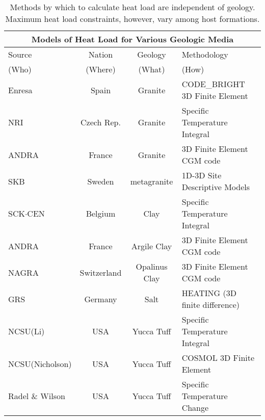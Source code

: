  \begin{table}[h!]
    \centering
    \footnotesize{
    \begin{tabularx}{\textwidth}{|X|c|c|X|}
      \multicolumn{4}{c}{\textbf{Models of Heat Load for Various Geologic Media}}\\
      \hline
      Source & Nation & Geology & Methodology \\  
      (Who) & (Where) & (What) & (How) \\  
      \hline
      Enresa \cite{von_lensa_red-impact_2008}           & Spain       & Granite       &  CODE\_BRIGHT 3D Finite Element \\ 
      NRI   \cite{von_lensa_red-impact_2008}            & Czech Rep.  & Granite       &  Specific Temperature Integral   \\
      ANDRA \cite{andra_granite:_2005}                  & France      & Granite       &  3D Finite Element CGM code   \\
      SKB \cite{ab_long-term_2006}                      & Sweden      & metagranite   &  1D-3D Site  Descriptive Models \\
      SCK$\cdot$CEN   \cite{von_lensa_red-impact_2008}  & Belgium     & Clay          &  Specific Temperature Integral   \\ 
      ANDRA \cite{andra_argile:_2005}                   & France      & Argile Clay   &  3D Finite Element CGM code   \\
      NAGRA \cite{johnson_project_2002, johnson_calculations_2002}  & Switzerland  & Opalinus Clay &  3D Finite Element CGM code \\
      GRS \cite{von_lensa_red-impact_2008}              & Germany     & Salt          &  HEATING (3D finite difference)   \\ 
      NCSU(Li)   \cite{li_examining_2007}               & USA         & Yucca Tuff    &  Specific Temperature Integral \\        
      NCSU(Nicholson) \cite{nicholson_thermal_2007}     & USA         & Yucca Tuff    &  COSMOL 3D Finite Element\\
      Radel \& Wilson \cite{radel_repository_2007}      & USA         & Yucca Tuff    &  Specific Temperature Change \\ 
      \hline
    \end{tabularx}
    \caption[International heat transport modeling methods in various geologic host media.]{Methods by which to calculate heat 
    load are independent of geology. Maximum heat load constraints, however, vary among host formations. }
    \label{tab:heat}
    }
  \end{table}
